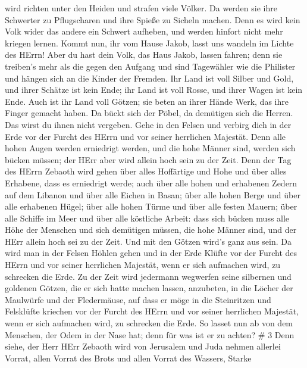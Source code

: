 wird richten unter den Heiden und strafen viele Völker. Da werden sie
ihre Schwerter zu Pflugscharen und ihre Spieße zu Sicheln machen. Denn
es wird kein Volk wider das andere ein Schwert aufheben, und werden
hinfort nicht mehr kriegen lernen.  Kommt nun, ihr vom Hause
Jakob, lasst uns wandeln im Lichte des HErrn!  Aber du hast
dein Volk, das Haus Jakob, lassen fahren; denn sie treiben's mehr als
die gegen den Aufgang und sind Tagewähler wie die Philister und hängen
sich an die Kinder der Fremden.  Ihr Land ist voll Silber
und Gold, und ihrer Schätze ist kein Ende; ihr Land ist voll Rosse, und
ihrer Wagen ist kein Ende.  Auch ist ihr Land voll Götzen;
sie beten an ihrer Hände Werk, das ihre Finger gemacht haben.
 Da bückt sich der Pöbel, da demütigen sich die Herren. Das
wirst du ihnen nicht vergeben.  Gehe in den Felsen und
verbirg dich in der Erde vor der Furcht des HErrn und vor seiner
herrlichen Majestät.  Denn alle hohen Augen werden
erniedrigt werden, und die hohe Männer sind, werden sich bücken müssen;
der HErr aber wird allein hoch sein zu der Zeit.  Denn der
Tag des HErrn Zebaoth wird gehen über alles Hoffärtige und Hohe und über
alles Erhabene, dass es erniedrigt werde;  auch über alle
hohen und erhabenen Zedern auf dem Libanon und über alle Eichen in
Basan;  über alle hohen Berge und über alle erhabenen
Hügel;  über alle hohen Türme und über alle festen Mauern;
 über alle Schiffe im Meer und über alle köstliche Arbeit:
 dass sich bücken muss alle Höhe der Menschen und sich
demütigen müssen, die hohe Männer sind, und der HErr allein hoch sei zu
der Zeit.  Und mit den Götzen wird's ganz aus sein.
 Da wird man in der Felsen Höhlen gehen und in der Erde
Klüfte vor der Furcht des HErrn und vor seiner herrlichen Majestät, wenn
er sich aufmachen wird, zu schrecken die Erde.  Zu der Zeit
wird jedermann wegwerfen seine silbernen und goldenen Götzen, die er
sich hatte machen lassen, anzubeten, in die Löcher der Maulwürfe und der
Fledermäuse,  auf dass er möge in die Steinritzen und
Felsklüfte kriechen vor der Furcht des HErrn und vor seiner herrlichen
Majestät, wenn er sich aufmachen wird, zu schrecken die Erde.
 So lasset nun ab von dem Menschen, der Odem in der Nase
hat; denn für was ist er zu achten? \# 3  Denn siehe, der
Herr HErr Zebaoth wird von Jerusalem und Juda nehmen allerlei Vorrat,
allen Vorrat des Brots und allen Vorrat des Wassers,  Starke
